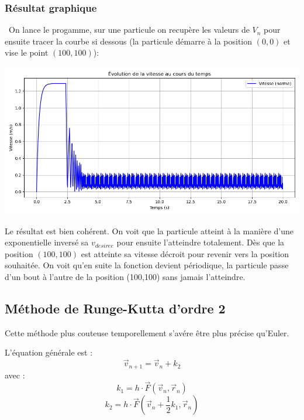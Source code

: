 \documentclass[a4paper,12pt]{article}
\begin{document}
\subsubsection{Résultat graphique}
\
On lance le progamme, sur une particule on recupère les valeurs de $V_n$ pour ensuite tracer la courbe si dessous (la particule démarre à la position $(0,0)$ et vise le point $(100,100)$):


\includegraphics[width=\textwidth]{graph_vitesse.png} %

Le résultat est bien cohérent. On voit que la particule atteint à la manière d'une exponentielle inversé sa $v_{desiree}$ pour ensuite l'atteindre totalement. Dès que la position $(100,100)$ est atteinte sa vitesse décroit pour revenir vers la position souhaitée. On voit qu'en suite la fonction devient périodique, la particule passe d'un bout à l'autre de la position (100,100) sans jamais l'atteindre.


\subsection*{Méthode de Runge-Kutta d'ordre 2}

Cette méthode plus couteuse temporellement s'avére être plus précise qu'Euler.

L’équation générale est :
\[
\vec{v}_{n+1} = \vec{v}_n + k_2
\]
avec :
\[
k_1 = h \cdot \vec{F}(\vec{v}_n, \vec{r}_n)
\]
\[
k_2 = h \cdot \vec{F} \left( \vec{v}_n + \frac{1}{2}k_1, \vec{r}_n \right)
\]
\end{document}
